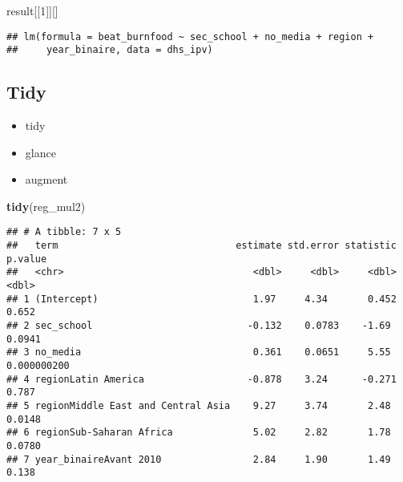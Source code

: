 \documentclass[
]{article}
\newenvironment{Shaded}{\begin{snugshade}}{\end{snugshade}}
\newcommand{\DecValTok}[1]{\textcolor[rgb]{0.00,0.00,0.81}{#1}}
\newcommand{\KeywordTok}[1]{\textcolor[rgb]{0.13,0.29,0.53}{\textbf{#1}}}
\newcommand{\NormalTok}[1]{#1}
\newcommand{\OperatorTok}[1]{\textcolor[rgb]{0.81,0.36,0.00}{\textbf{#1}}}
\newcommand{\StringTok}[1]{\textcolor[rgb]{0.31,0.60,0.02}{#1}}
\providecommand{\tightlist}{%
  \setlength{\itemsep}{0pt}\setlength{\parskip}{0pt}}
\begin{document}
\begin{Shaded}
\begin{Highlighting}[]
\NormalTok{result[[}\DecValTok{1}\NormalTok{]][]}
\end{Highlighting}
\end{Shaded}

\begin{verbatim}
## lm(formula = beat_burnfood ~ sec_school + no_media + region + 
##     year_binaire, data = dhs_ipv)
\end{verbatim}

\hypertarget{tidy}{%
\subsection{Tidy}\label{tidy}}

\begin{itemize}
\tightlist
\item
  tidy
\item
  glance
\item
  augment
\end{itemize}

\begin{Shaded}
\begin{Highlighting}[]
\KeywordTok{tidy}\NormalTok{(reg_mul2)}
\end{Highlighting}
\end{Shaded}

\begin{verbatim}
## # A tibble: 7 x 5
##   term                               estimate std.error statistic     p.value
##   <chr>                                 <dbl>     <dbl>     <dbl>       <dbl>
## 1 (Intercept)                           1.97     4.34       0.452 0.652      
## 2 sec_school                           -0.132    0.0783    -1.69  0.0941     
## 3 no_media                              0.361    0.0651     5.55  0.000000200
## 4 regionLatin America                  -0.878    3.24      -0.271 0.787      
## 5 regionMiddle East and Central Asia    9.27     3.74       2.48  0.0148     
## 6 regionSub-Saharan Africa              5.02     2.82       1.78  0.0780     
## 7 year_binaireAvant 2010                2.84     1.90       1.49  0.138
\end{verbatim}

\begin{Shaded}
\end{Shaded}
\end{document}
